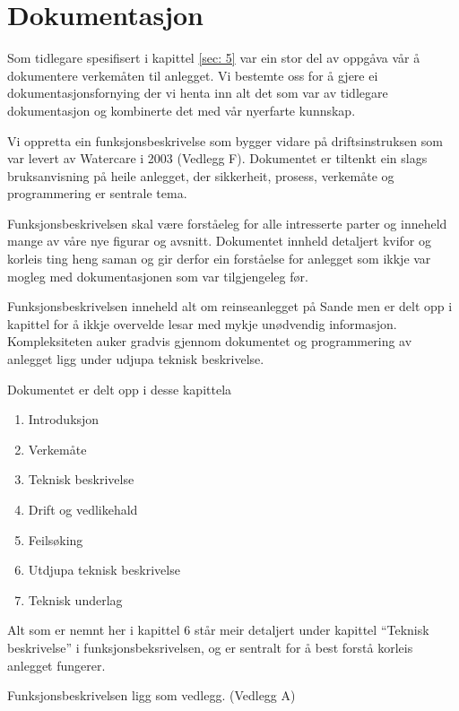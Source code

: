 \newpage
\section{Dokumentasjon}
\thispagestyle{fancy}

Som tidlegare spesifisert i kapittel \ref{sec: 5} var ein stor del av oppgåva vår å dokumentere
verkemåten til anlegget. Vi bestemte oss for å gjere ei dokumentasjonsfornying
der vi henta inn alt det som var av tidlegare dokumentasjon og kombinerte det med vår nyerfarte kunnskap.

Vi oppretta ein funksjonsbeskrivelse som bygger vidare på driftsinstruksen som var levert av 
Watercare i 2003 (Vedlegg F). Dokumentet er tiltenkt ein slags bruksanvisning på heile anlegget,
der sikkerheit, prosess, verkemåte og programmering er sentrale tema.

Funksjonsbeskrivelsen skal være forståeleg for alle intresserte parter og inneheld 
mange av våre nye figurar og avsnitt. Dokumentet innheld detaljert kvifor og korleis
ting heng saman og gir derfor ein forståelse for anlegget som ikkje var mogleg med dokumentasjonen som var tilgjengeleg før.

Funksjonsbeskrivelsen inneheld alt om reinseanlegget på Sande men er delt opp i kapittel for å ikkje
overvelde lesar med mykje unødvendig informasjon. Kompleksiteten auker gradvis gjennom dokumentet
og programmering av anlegget ligg under udjupa teknisk beskrivelse.

Dokumentet er delt opp i desse kapittela

\begin{enumerate}
    \item Introduksjon
    \item Verkemåte
    \item Teknisk beskrivelse
    \item Drift og vedlikehald
    \item Feilsøking
    \item Utdjupa teknisk beskrivelse
    \item Teknisk underlag
\end{enumerate}

Alt som er nemnt her i kapittel 6 står meir detaljert under kapittel ``Teknisk beskrivelse'' i funksjonsbeksrivelsen, og
er sentralt for å best forstå korleis anlegget fungerer.

Funksjonsbeskrivelsen ligg som vedlegg. (Vedlegg A)
